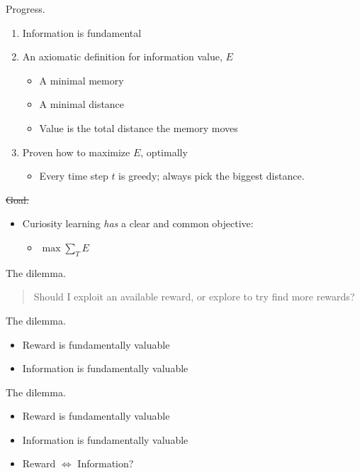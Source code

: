 \documentclass[10pt]{beamer}
\begin{document}
\begin{frame}[fragile]{Progress.}
\begin{enumerate}
\item Information is fundamental
\item An axiomatic definition for information value, $E$
\begin{itemize}
\item A minimal memory
\item A minimal distance
\item Value is the total distance the memory moves
\end{itemize}
\item Proven how to maximize $E$, optimally
\begin{itemize}
\item Every time step $t$ is greedy; always pick the biggest distance.
\end{itemize}
\end{enumerate}
\end{frame}

\begin{frame}[fragile]{\st{Goal.}}
\begin{itemize}
    \item Curiosity learning \textit{has} a clear and common objective:
    \begin{itemize}
        \item $ \max \sum_T E$
    \end{itemize}
\end{itemize}
\end{frame}

\begin{frame}[fragile]{The dilemma.}
    \begin{quote}
        Should I exploit an available reward, or explore to try find more rewards? 
    \end{quote}
\end{frame}

\begin{frame}[fragile]{The dilemma.}
\begin{itemize}
    \item Reward is fundamentally valuable
    \item Information is fundamentally valuable
\end{itemize}
\end{frame}

\begin{frame}[fragile]{The dilemma.}
\begin{itemize}
    \item Reward is fundamentally valuable
    \item Information is fundamentally valuable
    \item Reward $\Leftrightarrow$ Information?
\end{itemize}
\end{frame}
\end{document}
